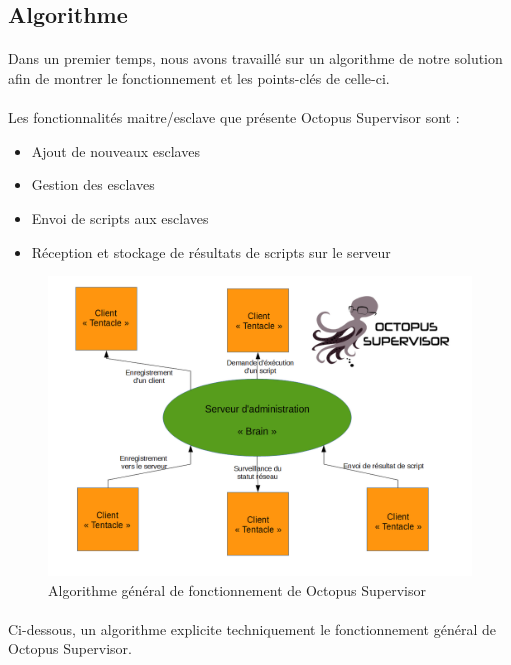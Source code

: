 \subsection{Algorithme}

\paragraph{}
Dans un premier temps, nous avons travaillé sur un algorithme de notre solution afin de montrer le fonctionnement et les points-clés de celle-ci.
\paragraph{}
Les fonctionnalités maitre/esclave que présente Octopus Supervisor sont :
\begin{itemize}
 \item Ajout de nouveaux esclaves
 \item Gestion des esclaves
 \item Envoi de scripts aux esclaves
 \item Réception et stockage de résultats de scripts sur le serveur
\end{itemize}

\begin{figure}[!h]
    \centering
    \includegraphics[width=\textwidth]{img/algo_general.png}
    \caption{Algorithme général de fonctionnement de Octopus Supervisor}
\end{figure}

\paragraph{}
Ci-dessous, un algorithme explicite techniquement le fonctionnement général de Octopus Supervisor.
